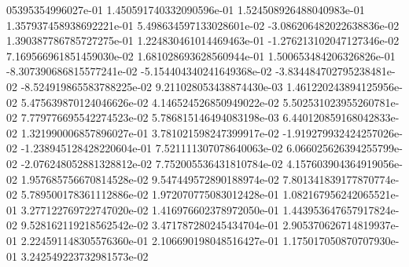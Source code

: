 05395354996027e-01	1.450591740332090596e-01	1.524508926488040983e-01	1.357937458938692221e-01	5.498634597133028601e-02	-3.086206482022638836e-02	1.390387786785727275e-01	1.224830461014469463e-01	-1.276213102047127346e-02	7.169566961851459030e-02	1.681028693628560944e-01	1.500653484206326826e-01	-8.307390686815577241e-02	-5.154404340241649368e-02	-3.834484702795238481e-02	-8.524919865583788225e-02	9.211028053438874430e-03	1.461220243894125956e-02	5.475639870124046626e-02	4.146524526850949022e-02	5.502531023955260781e-02	7.779776695542274523e-02	5.786815146494083198e-03	6.440120859168042833e-02	1.321990006857896027e-01	3.781021598247399917e-02	-1.919279932424257026e-02	-1.238945128428220604e-01	7.521111307078640063e-02	6.066025626394255799e-02	-2.076248052881328812e-02	7.752005536431810784e-02	4.157603904364919056e-02	1.957685756670814528e-02	9.547449572890188974e-02	7.801341839177870774e-02	5.789500178361112886e-02	1.972070775083012428e-01	1.082167956242065521e-01	3.277122769722747020e-02	1.416976602378972050e-01	1.443953647657917824e-02	9.528162119218562542e-02	3.471787280245434704e-01	2.905370626714819937e-01	2.224591148305576360e-01	2.106690198048516427e-01	1.175017050870707930e-01	3.242549223732981573e-02
